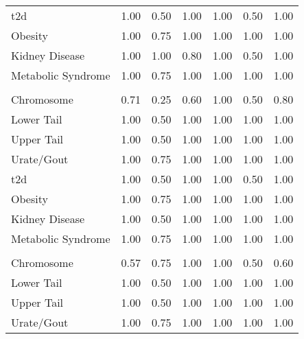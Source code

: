 \documentclass[]{report}
\begin{document}
\begin{table}
\begin{tabular}[t]{lllllll}
\hspace{1em}\Gls{t2d} & 1.00 & 0.50 & 1.00 & 1.00 & 0.50 & \vphantom{1} 1.00\\
\hspace{1em}Obesity & 1.00 & 0.75 & 1.00 & 1.00 & 1.00 & \vphantom{1} 1.00\\
\hspace{1em}Kidney Disease & 1.00 & 1.00 & 0.80 & 1.00 & 0.50 & 1.00\\
\hspace{1em}Metabolic Syndrome & 1.00 & 0.75 & 1.00 & 1.00 & 1.00 & \vphantom{2} 1.00\\
\addlinespace[0.3em]
\multicolumn{7}{l}{\textbf{Tajima's D}}\\
\hspace{1em}Chromosome & 0.71 & 0.25 & 0.60 & 1.00 & 0.50 & 0.80\\
\hspace{1em}Lower Tail & 1.00 & 0.50 & 1.00 & 1.00 & 1.00 & \vphantom{1} 1.00\\
\hspace{1em}Upper Tail & 1.00 & 0.50 & 1.00 & 1.00 & 1.00 & \vphantom{1} 1.00\\
\hspace{1em}Urate/Gout & 1.00 & 0.75 & 1.00 & 1.00 & 1.00 & \vphantom{1} 1.00\\
\hspace{1em}\Gls{t2d} & 1.00 & 0.50 & 1.00 & 1.00 & 0.50 & 1.00\\
\hspace{1em}Obesity & 1.00 & 0.75 & 1.00 & 1.00 & 1.00 & 1.00\\
\hspace{1em}Kidney Disease & 1.00 & 0.50 & 1.00 & 1.00 & 1.00 & 1.00\\
\hspace{1em}Metabolic Syndrome & 1.00 & 0.75 & 1.00 & 1.00 & 1.00 & \vphantom{1} 1.00\\
\addlinespace[0.3em]
\multicolumn{7}{l}{\textbf{Zeng's E}}\\
\hspace{1em}Chromosome & 0.57 & 0.75 & 1.00 & 1.00 & 0.50 & 0.60\\
\hspace{1em}Lower Tail & 1.00 & 0.50 & 1.00 & 1.00 & 1.00 & 1.00\\
\hspace{1em}Upper Tail & 1.00 & 0.50 & 1.00 & 1.00 & 1.00 & 1.00\\
\hspace{1em}Urate/Gout & 1.00 & 0.75 & 1.00 & 1.00 & 1.00 & 1.00\\

\end{tabular}
\end{table}
\end{document}
